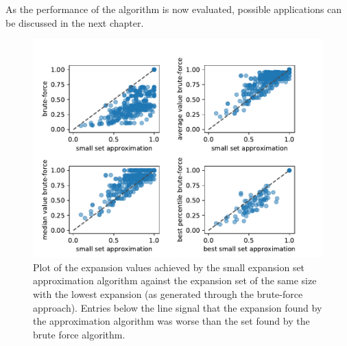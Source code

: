 As the performance of the algorithm is now evaluated, possible applications can be discussed in the next chapter.


\begin{figure}
	\centering
	\includegraphics[scale=1]{figures/quality_evaluation_log_expansion_values_for_same_number_verticies.pdf}
	\caption[Plot expansions approximation vs brute force]{Plot of the expansion values achieved by the small expansion set approximation algorithm against the expansion set of the same size with the lowest expansion (as generated through the brute-force approach).  Entries below the line signal that the expansion found by the approximation algorithm was worse than the set found by the brute force algorithm. \label{fig:expansion_approx_vs_brute}}
\end{figure}




